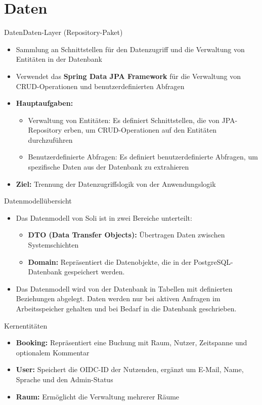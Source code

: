 \documentclass{sdqbeamer}
\begin{document}
\section{Daten}
\begin{frame}{Daten}{Daten-Layer (Repository-Paket)}
    \begin{itemize}
        \item Sammlung an Schnittstellen für den Datenzugriff und die Verwaltung von Entitäten in der Datenbank
        \item Verwendet das \textbf{Spring Data JPA Framework} für die Verwaltung von CRUD-Operationen und benutzerdefinierten Abfragen
        \item \textbf{Hauptaufgaben:}
        \begin{itemize}
            \item Verwaltung von Entitäten: Es definiert Schnittstellen, die von JPA-Repository erben, um CRUD-Operationen auf den Entitäten durchzuführen
            \item Benutzerdefinierte Abfragen: Es definiert benutzerdefinierte Abfragen, um spezifische Daten aus der Datenbank zu extrahieren
        \end{itemize}
        \item \textbf{Ziel:} Trennung der Datenzugriffslogik von der Anwendungslogik
    \end{itemize}
\end{frame}

\begin{frame}{Datenmodellübersicht}
    \begin{itemize}
        \item Das Datenmodell von Soli ist in zwei Bereiche unterteilt:
        \begin{itemize}
            \item \textbf{DTO (Data Transfer Objects):} Übertragen Daten zwischen Systemschichten
            \item \textbf{Domain:} Repräsentiert die Datenobjekte, die in der PostgreSQL-Datenbank gespeichert werden.
        \end{itemize}
        \item Das Datenmodell wird von der Datenbank in Tabellen mit definierten Beziehungen abgelegt. Daten werden nur bei aktiven Anfragen im Arbeitsspeicher gehalten und bei Bedarf in die Datenbank geschrieben.
    \end{itemize}
\end{frame}

\begin{frame}{Kernentitäten}
    \begin{itemize}
        \item \textbf{Booking:} Repräsentiert eine Buchung mit Raum, Nutzer, Zeitspanne und optionalem Kommentar
        \item \textbf{User:} Speichert die OIDC-ID der Nutzenden, ergänzt um E-Mail, Name, Sprache und den Admin-Status
        \item \textbf{Raum:} Ermöglicht die Verwaltung mehrerer Räume
    \end{itemize}
\end{frame}
\end{document}
